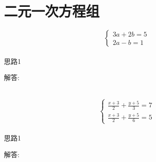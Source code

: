 \section{二元一次方程组}

\item {
    \[\left\{
        \begin{array}{l}
            3a + 2b = 5 \\
            2a - b = 1
        \end{array}
    \right.\]
    \ifshowSolution
        \fangsong{}
        \\
        思路1

        解答: 
    \else
        \\ \\ 
    \fi
}

\item {
    \[\left\{
        \begin{array}{l}
            \frac{x+3}{2} + \frac{y+5}{3} = 7 \\
            \frac{x+3}{2} + \frac{y+5}{6} = 5
        \end{array}
    \right.\]
    \ifshowSolution
        \fangsong{}
        \\
        思路1

        解答: 
    \else
        \\ \\ 
    \fi
}